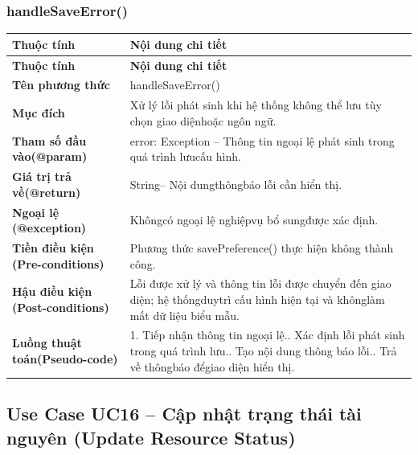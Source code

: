 \subsubsection{handleSaveError()}
\begin{longtable}{|L{0.24\textwidth}|L{0.70\textwidth}|}
\hline
\textbf{Thuộc tính} & \textbf{Nội dung chi tiết} \\
\hline
\endfirsthead
\hline
\textbf{Thuộc tính} & \textbf{Nội dung chi tiết} \\
\hline
\endhead
\textbf{Tên phương thức} & handleSaveError() \\
\hline
\textbf{Mục đích} & Xử lý lỗi phát sinh khi hệ thống không thể lưu tùy chọn giao diện\newline hoặc ngôn ngữ. \\
\hline
\textbf{Tham số đầu vào}\newline \textbf{(@param)} & error: Exception – Thông tin ngoại lệ phát sinh trong quá trình lưu\newline cấu hình. \\
\hline
\textbf{Giá trị trả về(@return)} & String– Nội dungthôngbáo lỗi cần hiển thị. \\
\hline
\textbf{Ngoại lệ (@exception)} & Khôngcó ngoại lệ nghiệpvụ bổ sungđược xác định. \\
\hline
\textbf{Tiền điều kiện (Pre-}\newline \textbf{conditions)} & Phương thức savePreference() thực hiện không thành công. \\
\hline
\textbf{Hậu điều kiện (Post-}\newline \textbf{conditions)} & Lỗi được xử lý và thông tin lỗi được chuyển đến giao diện; hệ thống\newline duytrì cấu hình hiện tại và khônglàm mất dữ liệu biểu mẫu. \\
\hline
\textbf{Luồng thuật toán}\newline \textbf{(Pseudo-code)} & 1. Tiếp nhận thông tin ngoại lệ.. Xác định lỗi phát sinh trong quá trình lưu.. Tạo nội dung thông báo lỗi.. Trả về thôngbáo đểgiao diện hiển thị. \\
\hline
\end{longtable}
\vspace{-0.5\baselineskip}
\subsection{Use Case UC16 – Cập nhật trạng thái tài nguyên (Update Resource Status)}
